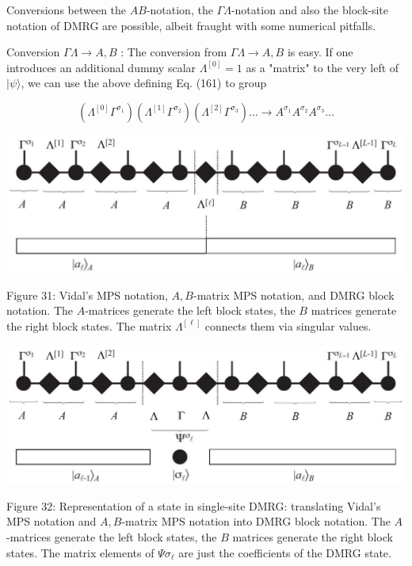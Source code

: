 \documentclass[12pt]{article}
\begin{document}
Conversions between the $A B$-notation, the $\Gamma \Lambda$-notation and also the block-site notation of DMRG are possible, albeit fraught with some numerical pitfalls.

Conversion $\Gamma \Lambda \rightarrow A, B$ : The conversion from $\Gamma \Lambda \rightarrow A, B$ is easy. If one introduces an additional dummy scalar $\Lambda^{[0]}=1$ as a "matrix" to the very left of $|\psi\rangle$, we can use the above defining Eq. (161) to group


\begin{equation*}
\left(\Lambda^{[0]} \Gamma^{\sigma_{1}}\right)\left(\Lambda^{[1]} \Gamma^{\sigma_{2}}\right)\left(\Lambda^{[2]} \Gamma^{\sigma_{3}}\right) \ldots \rightarrow A^{\sigma_{1}} A^{\sigma_{2}} A^{\sigma_{3}} \ldots \tag{166}
\end{equation*}


\begin{center}
\includegraphics[max width=\textwidth]{2024_05_04_afc4ad226da9ccfe0ac8g-053}
\end{center}

Figure 31: Vidal's MPS notation, $A, B$-matrix MPS notation, and DMRG block notation. The $A$-matrices generate the left block states, the $B$ matrices generate the right block states. The matrix $\Lambda^{[\ell]}$ connects them via singular values.

\begin{center}
\includegraphics[max width=\textwidth]{2024_05_04_afc4ad226da9ccfe0ac8g-053(1)}
\end{center}

Figure 32: Representation of a state in single-site DMRG: translating Vidal's MPS notation and $A, B$-matrix MPS notation into DMRG block notation. The $A$-matrices generate the left block states, the $B$ matrices generate the right block states. The matrix elements of $\Psi \sigma_{\ell}$ are just the coefficients of the DMRG state.
\end{document}
